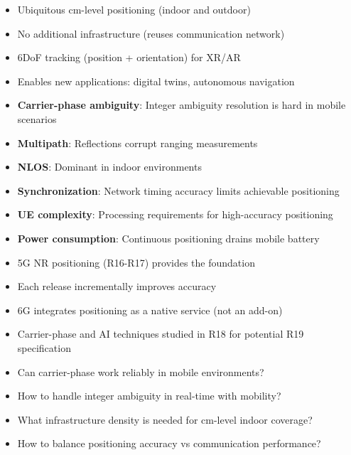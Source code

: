 \begin{itemize}
\tightlist
\item
  Ubiquitous cm-level positioning (indoor and outdoor)
\item
  No additional infrastructure (reuses communication network)
\item
  6DoF tracking (position + orientation) for XR/\allowbreak{}AR
\item
  Enables new applications: digital twins, autonomous navigation
\end{itemize}


\begin{itemize}
\tightlist
\item
  \textbf{Carrier-phase ambiguity}: Integer ambiguity resolution is hard in mobile scenarios
\item
  \textbf{Multipath}: Reflections corrupt ranging measurements
\item
  \textbf{NLOS}: Dominant in indoor environments
\item
  \textbf{Synchronization}: Network timing accuracy limits achievable positioning
\item
  \textbf{UE complexity}: Processing requirements for high-accuracy positioning
\item
  \textbf{Power consumption}: Continuous positioning drains mobile battery
\end{itemize}


\begin{itemize}
\tightlist
\item
  5G NR positioning (R16-R17) provides the foundation
\item
  Each release incrementally improves accuracy
\item
  6G integrates positioning as a native service (not an add-on)
\item
  Carrier-phase and AI techniques studied in R18 for potential R19 specification
\end{itemize}


\begin{itemize}
\tightlist
\item
  Can carrier-phase work reliably in mobile environments?
\item
  How to handle integer ambiguity in real-time with mobility?
\item
  What infrastructure density is needed for cm-level indoor coverage?
\item
  How to balance positioning accuracy vs communication performance?
\end{itemize}

